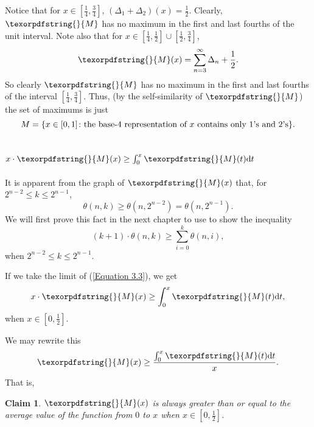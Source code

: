 \documentclass[12pt]{ucthesis}
\theoremstyle{plain}
\newtheorem{claim}{Claim}
\theoremstyle{definition}
\newcommand{\takagi}{
  \texorpdfstring{\protect}{M}
}
\begin{document}
Notice that for $x \in [\frac{1}{4}, \frac{3}{4}]$, $(\Delta_1 + \Delta_2)(x) = \frac{1}{2}$.
Clearly, $\takagi$ has no maximum in the first and last fourths of the unit interval.
Note also that for $x \in [\frac{1}{4}, \frac{1}{2}] \cup [\frac{1}{2}, \frac{3}{4}]$,
\begin{equation*}
\takagi(x) = \sum_{n = 3}^\infty \Delta_n + \frac{1}{2}.
\end{equation*}
So clearly $\takagi$ has no maximum in the first and last fourths of the interval
$[\frac{1}{4}, \frac{3}{4}]$.
Thus, (by the self-similarity of $\takagi$) the set of maximums is just
\begin{equation*}
M = \{x \in [0, 1] \colon \textnormal{the base-4 representation of } x \textnormal{ contains only 1's and 2's}\}.
\end{equation*}

\section{
  \texorpdfstring{
    $x \cdot \takagi(x) \ge \int_0^x \takagi(t) \mathrm{d}t$
  }{
    x M(x) >= int\{0\}\{x\} M(t) dt
  }
}
\label{Section 3.4}

It is apparent from the graph of $\takagi(x)$ that, for $2^{n - 2} \le k \le 2^{n - 1}$,
\begin{equation*}
\theta(n, k) \ge \theta(n, 2^{n - 2}) = \theta(n, 2^{n - 1}).
\end{equation*}
We will first prove this fact in the next chapter to use to show the inequality
\begin{equation}
\label{Equation 3.3}
(k + 1) \cdot \theta(n, k) \ge \sum_{i = 0}^k \theta(n, i),
\end{equation}
when $2^{n - 2} \le k \le 2^{n - 1}$.

If we take the limit of (\ref{Equation 3.3}), we get
\begin{equation*}
x \cdot \takagi(x) \ge \int_0^x \takagi(t) \mathrm{d}t,
\end{equation*}
when $x \in [0, \frac{1}{2}]$.

We may rewrite this
\begin{equation*}
\takagi(x) \ge \frac{\int_0^x \takagi(t) \mathrm{d}t}{x}.
\end{equation*}
That is,
\begin{claim}
\label{Claim 2}
$\takagi(x)$ is always greater than or equal to the average value of the function
from $0$ to $x$ when $x \in [0, \frac{1}{2}]$.
\end{claim}
\end{document}
